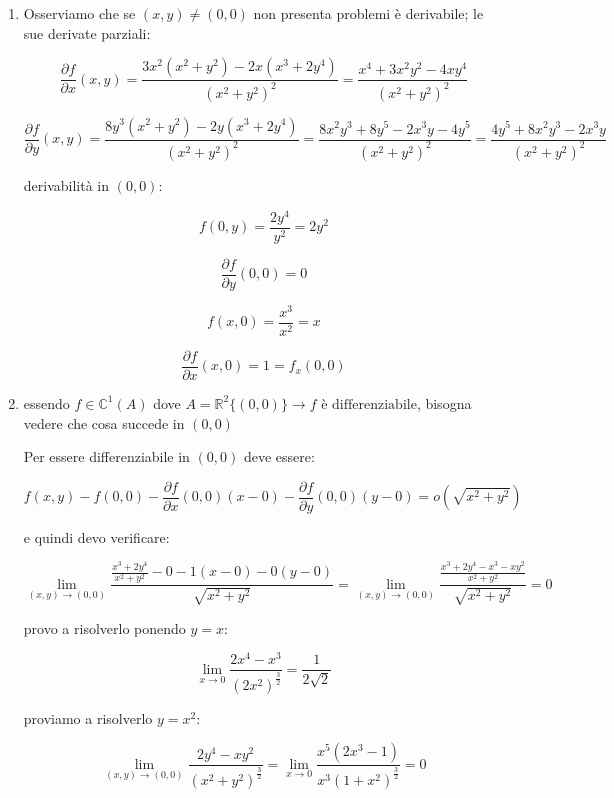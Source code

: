 \documentclass[../appunti-analisi.tex]{subfiles}
\begin{document}
\begin{enumerate}
    \item Osserviamo che se $(x,y) \neq (0,0)$ non presenta problemi è derivabile; le sue derivate parziali:

        \[
            \frac{\partial f}{\partial x}(x,y) = \frac{3x^{2}(x^{2}+y^{2})-2x(x^{3}+2y^{4})}{(x^{2}+y^{2})^{2}}= \frac{x^{4}+3x^{2}y^{2}-4xy^{4}}{(x^{2}+y^{2})^{2}}
        \]

        \[
            \frac{\partial f}{\partial y}(x,y) = \frac{8y^{3}(x^{2}+y^{2}) - 2y(x^{3}+2y^{4})}{(x^{2}+y^{2})^{2}}= \frac{8x^{2}y^{3}+8y^{5}-2x^{3}y-4y^{5}}{(x^{2}+y^{2})^{2}} = \frac{4y^{5}+8x^{2}y^{3}-2x^{3}y}{(x^{2}+y^{2})^{2}}
        \]

        derivabilità in $(0,0)$:

        \[
            f(0,y) = \frac{2y^{4}}{y^{2}} = 2y^{2}
        \]

        \[
            \frac{\partial f}{\partial y}(0,0) = 0
        \]

        \[
            f(x,0) = \frac{x^{3}}{x^{2}} = x
        \]

        \[
            \frac{\partial f}{\partial x}(x,0) = 1 = f_x(0,0)
        \]

    \item 
        essendo $f \in \mathbb{C}^{1}(A)$ dove $A = \mathbb{R}^{2} \{(0,0)\} \rightarrow f \text{ è differenziabile}$, bisogna vedere che cosa succede in $(0,0)$

        Per essere differenziabile in $(0,0)$ deve essere:

        \[
            f(x,y) - f(0,0) - \frac{\partial f}{\partial x}(0,0) (x-0) - \frac{\partial f}{\partial y}(0,0) (y-0) = o(\sqrt{x^{2}+y^{2}})
        \]
        
        e quindi devo verificare:

        \[
            \lim_{ (x,y) \to (0,0) } \frac{ \frac{x^{3}+2y^{4}}{x^{2}+y^{2}}-0 -1(x-0) -0(y-0)}{\sqrt{x^{2}+y^{2}}} = \lim_{ (x,y) \to (0,0) } \frac{ \frac{x^{3}+2y^{4}- x^{3}-xy^{2}}{x^{2}+y^{2}}}{\sqrt{x^{2}+y^{2}}} = 0
        \]


        provo a risolverlo ponendo $y=x$:

        \[
            \lim_{ x \to 0 } \frac{2x^{4}-x^{3}}{(2x^{2})^{ \frac{3}{2}}} = \frac{1}{2 \sqrt{2}}
        \]

        proviamo a risolverlo $y=x^{2}$:

        \[
           \lim_{ (x,y) \to (0,0) }  \frac{2y^{4}-xy^{2}}{(x^{2}+y^{2})^{ \frac{3}{2}}} = \lim_{ x \to 0 } \frac{x^{5}(2x^{3}-1)}{x^{3}(1+x^{2})^{ \frac{3}{2}}} = 0
        \]

\end{enumerate}
\end{document}
